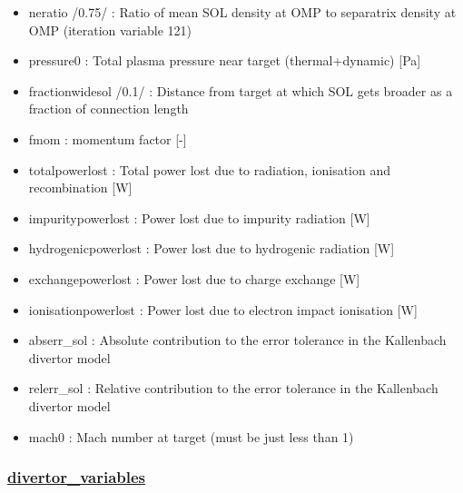 \documentclass[
]{article}
\begin{document}
\begin{itemize}
\begin{itemize}
  \item
    neratio /0.75/ : Ratio of mean SOL density at OMP to separatrix
    density at OMP (iteration variable 121)
  \item
    pressure0 : Total plasma pressure near target (thermal+dynamic)
    {[}Pa{]}
  \item
    fractionwidesol /0.1/ : Distance from target at which SOL gets
    broader as a fraction of connection length
  \item
    fmom : momentum factor {[}-{]}
  \item
    totalpowerlost : Total power lost due to radiation, ionisation and
    recombination {[}W{]}
  \item
    impuritypowerlost : Power lost due to impurity radiation {[}W{]}
  \item
    hydrogenicpowerlost : Power lost due to hydrogenic radiation {[}W{]}
  \item
    exchangepowerlost : Power lost due to charge exchange {[}W{]}
  \item
    ionisationpowerlost : Power lost due to electron impact ionisation
    {[}W{]}
  \item
    abserr\_sol : Absolute contribution to the error tolerance in the
    Kallenbach divertor model
  \item
    relerr\_sol : Relative contribution to the error tolerance in the
    Kallenbach divertor model
  \item
    mach0 : Mach number at target (must be just less than 1)
  \end{itemize}

  \hypertarget{divertor_variables}{%
  \subsubsection{\texorpdfstring{\href{divertor_variables.html}{divertor\_variables}}{divertor\_variables}}\label{divertor_variables}}


\end{itemize}
\end{document}
